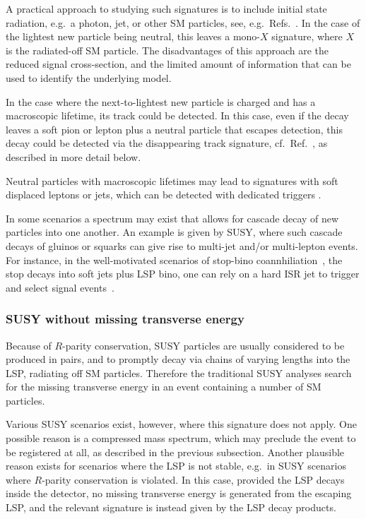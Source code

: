 \documentclass[10pt]{article}
\begin{document}
A practical approach to studying such signatures is to include initial state radiation, e.g.\ a photon, jet, or other SM particles, see, e.g.\ Refs.~\cite{Chen:1996ap,Ibe:2006de}. 
In the case of the lightest new particle being neutral, this leaves a mono-$X$ signature, where $X$ is the radiated-off SM particle. 
The disadvantages of this approach are the reduced signal cross-section, and the limited amount of information that can be used to identify the underlying model.

In the case where the next-to-lightest new particle is charged and has a macroscopic lifetime, its track could be detected.
In this case, even if the decay leaves a soft pion or lepton plus a neutral particle that escapes detection, this decay could be detected via the disappearing track signature, cf.\ Ref.~\cite{ATLAS:2021ttq}, as described in more detail below.

Neutral particles with macroscopic lifetimes may lead to
signatures with soft displaced leptons or jets, which can be detected
with dedicated triggers \cite{Blekman:2020hwr}.

In some scenarios a spectrum may exist that allows for cascade decay of new particles into one another.
An example is given by SUSY, where such cascade decays of gluinos or squarks can give rise to multi-jet and/or multi-lepton events. For instance, in the well-motivated scenarios of stop-bino coannhiliation~\cite{Boehm:1999bj,Ellis:2001nx,Diaz-Cruz:2007ewo,Han:2013gba,Ellis:2014ipa,Keung:2017kot}, the stop decays into soft jets plus LSP bino, one can rely on a hard ISR jet to trigger and select signal events~\cite{An:2021yqd}.


\subsubsection{SUSY without missing transverse energy}
%
Because of $R$-parity conservation, SUSY particles are usually considered to be produced in pairs, and to promptly decay via chains of varying lengths into the LSP, radiating off SM particles.
Therefore the traditional SUSY analyses search for the missing transverse energy in an event containing a number of SM particles.

Various SUSY scenarios exist, however, where this signature does not apply.
One possible reason is a compressed mass spectrum, which may preclude the event to be registered at all, as described in the previous subsection.
Another plausible reason exists for scenarios where the LSP is not stable, e.g.\ in SUSY scenarios where $R$-parity conservation is violated.
In this case, provided the LSP decays inside the detector, no missing transverse energy is generated from the escaping LSP, and the relevant signature is instead given by the LSP decay products.
\end{document}
